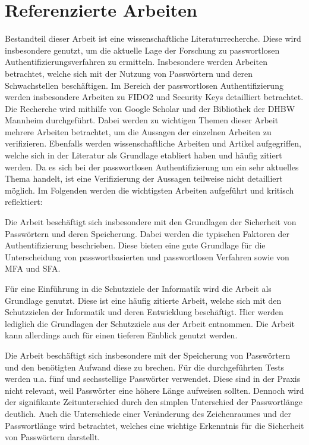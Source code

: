 \section{Referenzierte Arbeiten}

Bestandteil dieser Arbeit ist eine wissenschaftliche Literaturrecherche. Diese wird insbesondere genutzt, um die aktuelle Lage der Forschung zu passwortlosen Authentifizierungsverfahren zu ermitteln. Insbesondere werden Arbeiten betrachtet, welche sich mit der Nutzung von Passwörtern und deren Schwachstellen beschäftigen. Im Bereich der passwortlosen Authentifizierung werden insbesondere Arbeiten zu \ac{FIDO}2 und Security Keys detailliert betrachtet. Die Recherche wird mithilfe von Google Scholar und der Bibliothek der DHBW Mannheim durchgeführt. Dabei werden zu wichtigen Themen dieser Arbeit mehrere Arbeiten betrachtet, um die Aussagen der einzelnen Arbeiten zu verifizieren. Ebenfalls werden wissenschaftliche Arbeiten und Artikel aufgegriffen, welche sich in der Literatur als Grundlage etabliert haben und häufig zitiert werden. Da es sich bei der passwortlosen Authentifizierung um ein sehr aktuelles Thema handelt, ist eine Verifizierung der Aussagen teilweise nicht detailliert möglich. Im Folgenden werden die wichtigsten Arbeiten aufgeführt und kritisch reflektiert:

Die Arbeit \cite{boonkrong2012security} beschäftigt sich insbesondere mit den Grundlagen der Sicherheit von Passwörtern und deren Speicherung. Dabei werden die typischen Faktoren der Authentifizierung beschrieben. Diese bieten eine gute Grundlage für die Unterscheidung von passwortbasierten und passwortlosen Verfahren sowie von \ac{MFA} und \ac{SFA}. 

Für eine Einführung in die Schutzziele der Informatik wird die Arbeit \cite{samonas2014cia} als Grundlage genutzt. Diese ist eine häufig zitierte Arbeit, welche sich mit den Schutzzielen der Informatik und deren Entwicklung beschäftigt. Hier werden lediglich die Grundlagen der Schutzziele aus der Arbeit entnommen. Die Arbeit kann allerdings auch für einen tieferen Einblick genutzt werden.

Die Arbeit \cite{chanda2016password} beschäftigt sich insbesondere mit der Speicherung von Passwörtern und den benötigten Aufwand diese zu brechen. Für die durchgeführten Tests werden u.a. fünf und sechsstellige Passwörter verwendet. Diese sind in der Praxis nicht relevant, weil Passwörter eine höhere Länge aufweisen sollten. Dennoch wird der signifikante Zeitunterschied durch den simplen Unterschied der Passwortlänge deutlich. Auch die Unterschiede einer Veränderung des Zeichenraumes und der Passwortlänge wird betrachtet, welches eine wichtige Erkenntnis für die Sicherheit von Passwörtern darstellt.

